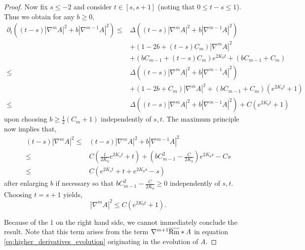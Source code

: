 \documentclass{amsart}
\begin{document}
\begin{proof}
Now fix \(s \leq -2\) and consider \(t \in [s, s+1]\) (noting that \(0 \leq t-s \leq 1\)). Thus we obtain for any \(b \geq 0\),
\begin{align*}
\partial_t ((t-s)|\nabla^m A|^2 + b|\nabla^{m-1} A|^2) \leq& \Delta((t-s)|\nabla^m A|^2 + b|\nabla^{m-1}A|^2) \\
&+ (1 - 2b + (t-s)C_m) |\nabla^m A|^2 \\
& + (bC_{m-1} + (t-s)C_m) e^{2K_0 t} + (bC_{m-1} + C_m) \\
\leq& \Delta((t-s)|\nabla^m A|^2 + b|\nabla^{m-1}A|^2) \\
&+ (1 - 2b + C_m) |\nabla^m A|^2 + (bC_{m-1} + C_m) (e^{2K_0 t} + 1) \\
\leq& \Delta((t-s)|\nabla^m A|^2 + b|\nabla^{m-1}A|^2) + C (e^{2K_0 t} + 1)
\end{align*}
upon choosing \(b \geq \tfrac{1}{2}(C_m + 1)\) independently of \(s, t\). The maximum principle now implies that,
\[
\begin{split}
(t-s) |\nabla^m A|^2 \leq& (t-s)|\nabla^m A|^2 + b|\nabla^{m-1} A|^2 \\
\leq& C\left(\frac{1}{2K_0} e^{2K_o t} + t\right) + \left(bC_{m-1}^2 - \frac{C}{2K_0}\right)e^{2K_0 s} - Cs \\
\leq& C(e^{2K_o t} + t + e^{2K_0 s} - s)
\end{split}
\]
after enlarging \(b\) if necessary so that \(bC_{m-1}^2 - \tfrac{C}{2K_0} \geq 0\) independently of \(s,t\). Choosing \(t = s + 1\) yields,
\[
|\nabla^m A|^2 \leq C (e^{2K_0t} + 1).
\]

Because of the \(1\) on the right hand side, we cannot immediately conclude the result. Note that this term arises from the term \(\nabla^{m+1} \overline{\operatorname{Rm}} \ast A\) in equation \eqref{eq:higher_derivatives_evolution} originating in the evolution of \(A\).
\end{proof}

\printbibliography
\end{document}
